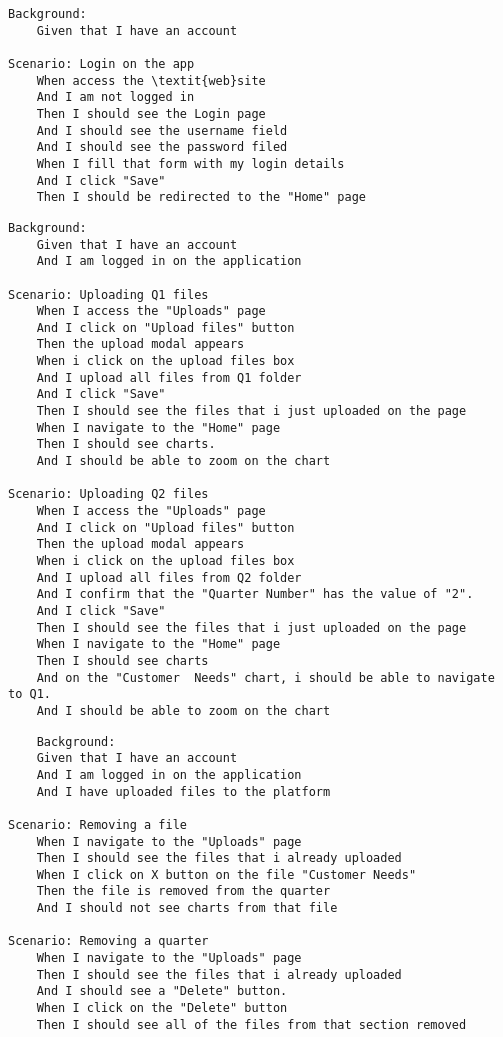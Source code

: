 \begin{verbatim}
Background:
	Given that I have an account

Scenario: Login on the app
	When access the \textit{web}site
	And I am not logged in
	Then I should see the Login page
	And I should see the username field
	And I should see the password filed
	When I fill that form with my login details
	And I click "Save"
	Then I should be redirected to the "Home" page
\end{verbatim}
    
\begin{verbatim}
Background:
	Given that I have an account
	And I am logged in on the application

Scenario: Uploading Q1 files
	When I access the "Uploads" page  
	And I click on "Upload files" button 
	Then the upload modal appears 
	When i click on the upload files box
	And I upload all files from Q1 folder
	And I click "Save"
	Then I should see the files that i just uploaded on the page
	When I navigate to the "Home" page
	Then I should see charts. 
	And I should be able to zoom on the chart
	
Scenario: Uploading Q2 files
	When I access the "Uploads" page  
	And I click on "Upload files" button 
	Then the upload modal appears 
	When i click on the upload files box
	And I upload all files from Q2 folder
	And I confirm that the "Quarter Number" has the value of "2".
	And I click "Save"
	Then I should see the files that i just uploaded on the page
	When I navigate to the "Home" page
	Then I should see charts
	And on the "Customer  Needs" chart, i should be able to navigate to Q1.
	And I should be able to zoom on the chart
\end{verbatim}

\begin{verbatim}
    Background:  
	Given that I have an account
	And I am logged in on the application
	And I have uploaded files to the platform
 
Scenario: Removing a file
	When I navigate to the "Uploads" page  
	Then I should see the files that i already uploaded
	When I click on X button on the file "Customer Needs"
	Then the file is removed from the quarter
	And I should not see charts from that file
	
Scenario: Removing a quarter
	When I navigate to the "Uploads" page  
	Then I should see the files that i already uploaded
	And I should see a "Delete" button.
	When I click on the "Delete" button
	Then I should see all of the files from that section removed 
\end{verbatim}

